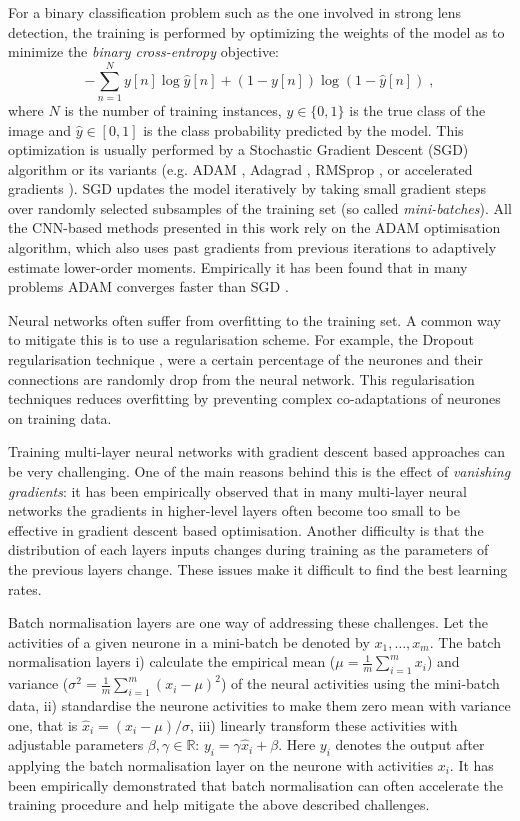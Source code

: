 \documentclass{aa}
\begin{document}
For a binary classification problem such as the one involved in strong lens detection, the training is performed by optimizing the weights of the model as to minimize the \textit{binary cross-entropy} objective:
\begin{equation}
	- \sum_{n=1}^{N} y[n] \log \hat{y}[n] + (1 - y[n])\log(1 - \hat{y}[n]) \;,
\end{equation}
where $N$ is the number of training instances, $y \in \{0,1\}$ is the true class of the image and $\hat{y} \in [0,1]$ is the class probability predicted by the model. This optimization is usually performed by a Stochastic Gradient Descent (SGD) algorithm or its variants (e.g. ADAM \citep{Kingma_2014}, Adagrad \citep{duchi12adaptive}, RMSprop \citep{Tieleman12RMSProp}, or accelerated gradients \citep{nesterov83method}). SGD updates the model iteratively by taking small gradient steps over randomly selected subsamples of the training set (so called \textit{mini-batches}). All the CNN-based methods presented in this work rely on the ADAM optimisation algorithm, which also uses past gradients from previous iterations to adaptively estimate lower-order moments. Empirically it has been found that in many problems ADAM converges faster than SGD \citep{Ruder16overview}.

Neural networks often suffer from overfitting to the training set.  A common way to mitigate this is to use a regularisation scheme.  For example, the Dropout regularisation technique \citep{2012arXiv1207.0580H,JMLR:v15:srivastava14a}, were a certain percentage of the neurones and their connections are  randomly drop  from the neural network. This regularisation techniques reduces overfitting  by preventing complex co-adaptations of neurones on training data. 

Training multi-layer neural networks with gradient descent based approaches can be very challenging. One of the main reasons behind this is the effect of \textit{vanishing gradients}: it has been empirically observed that in many multi-layer neural networks the gradients in higher-level layers often become too small to be effective in gradient descent based optimisation. Another difficulty is that the distribution of each layers inputs changes during training as the parameters of the previous layers change. These issues make it difficult to find the best learning rates.

Batch normalisation layers \citep{batch_norm} are one way of addressing these challenges.  Let the activities of a given neurone in a mini-batch be denoted by $x_1,\ldots,x_m$. The batch normalisation layers i) calculate the empirical mean ($\mu = \frac{1}{m}\sum_{i=1}^m x_i $) and variance ($\sigma^2 = \frac{1}{m}\sum_{i=1}^m (x_i-\mu)^2 $) of the neural activities using the mini-batch data, ii) standardise the neurone activities to make them zero mean with variance one, that is $\hat x_i = (x_i-\mu)/\sigma$, iii) linearly transform these activities with adjustable parameters $\beta, \gamma \in \mathbb{R}$: $y_i=\gamma\hat x_i +\beta$. Here $y_i$ denotes the output after applying the batch normalisation layer on the neurone with activities $x_i$. It has been empirically demonstrated that batch normalisation can often accelerate the training procedure and help mitigate the above described challenges.
\end{document}
